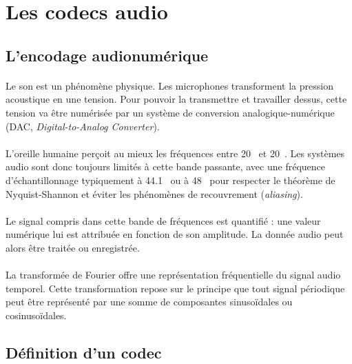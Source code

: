 \documentclass{article}
\begin{document}
    \newpage
    \section{Les codecs audio}
    \subsection{L'encodage audionumérique}
    \label{audionumerique}
    \paragraph{}
    Le son est un phénomène physique. Les microphones transforment la pression acoustique en une tension. Pour pouvoir la transmettre et travailler dessus, cette tension va être numérisée par un système de conversion analogique-numérique (DAC, \emph{Digital-to-Analog Converter})\cite{2005-embrechts}.

    \paragraph{}
    L'oreille humaine perçoit au mieux les fréquences entre \SI{20}{\emph{\hertz}} et \SI{20}{\emph{\kilo\hertz}}. Les systèmes audio sont donc toujours limités à cette bande passante, avec une fréquence d'échantillonnage typiquement à \SI{44.1}{\emph{\kilo\hertz}} ou à \SI{48}{\emph{\kilo\hertz}} pour respecter le théorème de Nyquist-Shannon et éviter les phénomènes de recouvrement (\emph{aliasing}).

    \paragraph{}
    Le signal compris dans cette bande de fréquences est quantifié : une valeur numérique lui est attribuée en fonction de son amplitude. La donnée audio peut alors être traitée ou enregistrée.

    \paragraph{}
    La transformée de Fourier offre une représentation fréquentielle du signal audio temporel. Cette transformation repose sur le principe que tout signal périodique peut être représenté par une somme de composantes sinusoïdales ou cosinusoïdales.


    \subsection{Définition d'un codec}
\end{document}
